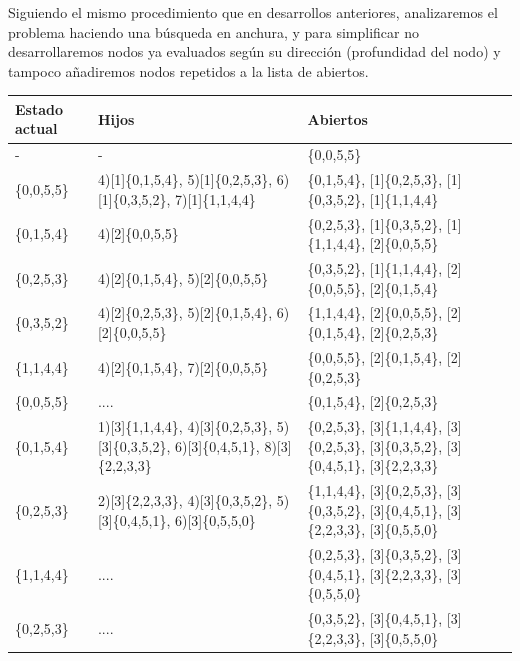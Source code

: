 \documentclass{article}
\begin{document}
Siguiendo el mismo procedimiento que en desarrollos anteriores, analizaremos el problema haciendo una búsqueda en anchura, y para simplificar no desarrollaremos nodos ya evaluados según su dirección (profundidad del nodo) y tampoco añadiremos nodos repetidos a la lista de abiertos. \\

\begin{center}
  \begin{longtable}{ |p{2cm}|p{2cm}|>{\raggedright\arraybackslash}p{7cm}|  }
    \hline
    Estado actual & Hijos & Abiertos \\ [0.5ex]
    \hline\hline
    
    - & - & [0]\{0,0,5,5\} \\ 
    \hline
    [0]\{0,0,5,5\} & 4)[1]\{0,1,5,4\}, 5)[1]\{0,2,5,3\}, 6)[1]\{0,3,5,2\}, 7)[1]\{1,1,4,4\} & [1]\{0,1,5,4\}, [1]\{0,2,5,3\}, [1]\{0,3,5,2\}, [1]\{1,1,4,4\} \\ 
    \hline
    [1]\{0,1,5,4\} & 4)[2]\{0,0,5,5\} & [1]\{0,2,5,3\}, [1]\{0,3,5,2\}, [1]\{1,1,4,4\}, [2]\{0,0,5,5\} \\ 
    \hline
    [1]\{0,2,5,3\} & 4)[2]\{0,1,5,4\}, 5)[2]\{0,0,5,5\} & [1]\{0,3,5,2\}, [1]\{1,1,4,4\}, [2]\{0,0,5,5\}, [2]\{0,1,5,4\} \\ 
    \hline
    [1]\{0,3,5,2\} & 4)[2]\{0,2,5,3\}, 5)[2]\{0,1,5,4\}, 6)[2]\{0,0,5,5\} & [1]\{1,1,4,4\}, [2]\{0,0,5,5\}, [2]\{0,1,5,4\}, [2]\{0,2,5,3\} \\ 
    \hline
    [1]\{1,1,4,4\} & 4)[2]\{0,1,5,4\}, 7)[2]\{0,0,5,5\} & [2]\{0,0,5,5\}, [2]\{0,1,5,4\}, [2]\{0,2,5,3\} \\ 
    \hline
    [2]\{0,0,5,5\} & .... & [2]\{0,1,5,4\}, [2]\{0,2,5,3\} \\ 
    \hline
    [2]\{0,1,5,4\} & 1)[3]\{1,1,4,4\}, 4)[3]\{0,2,5,3\}, 5)[3]\{0,3,5,2\}, 6)[3]\{0,4,5,1\}, 8)[3]\{2,2,3,3\} & [2]\{0,2,5,3\}, [3]\{1,1,4,4\}, [3]\{0,2,5,3\}, [3]\{0,3,5,2\}, [3]\{0,4,5,1\}, [3]\{2,2,3,3\} \\ 
    \hline
    [2]\{0,2,5,3\} & 2)[3]\{2,2,3,3\}, 4)[3]\{0,3,5,2\}, 5)[3]\{0,4,5,1\}, 6)[3]\{0,5,5,0\} & [3]\{1,1,4,4\}, [3]\{0,2,5,3\}, [3]\{0,3,5,2\}, [3]\{0,4,5,1\}, [3]\{2,2,3,3\}, [3]\{0,5,5,0\} \\ 
    \hline
    [3]\{1,1,4,4\} & .... & [3]\{0,2,5,3\}, [3]\{0,3,5,2\}, [3]\{0,4,5,1\}, [3]\{2,2,3,3\}, [3]\{0,5,5,0\} \\ 
    \hline
    [3]\{0,2,5,3\} & .... & [3]\{0,3,5,2\}, [3]\{0,4,5,1\}, [3]\{2,2,3,3\}, [3]\{0,5,5,0\} \\ 
    \hline

\end{longtable}
\end{center}
\end{document}
